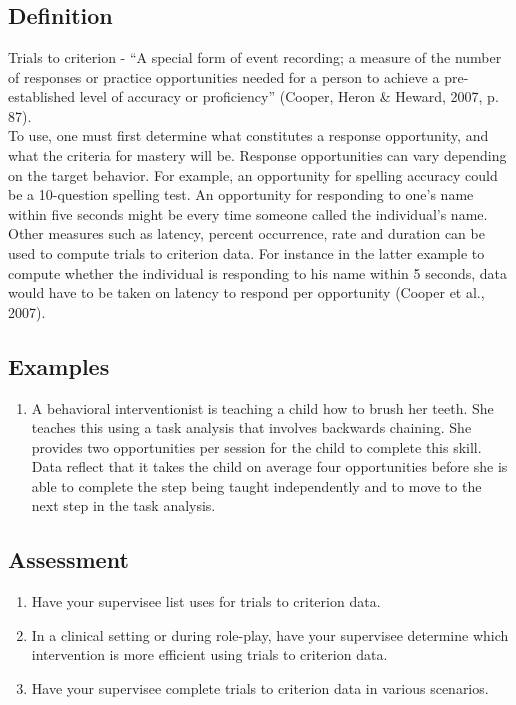 \section{\fouraSeven{}}
\subsection{Definition}
Trials to criterion - ``A special form of event recording; a measure of the number of responses or practice opportunities needed for a person to achieve a pre-established level of accuracy or proficiency'' (Cooper, Heron \& Heward, 2007, p.  87).\\

To use, one must first determine what constitutes a response opportunity, and what the criteria for mastery will be. Response opportunities can vary depending on the target behavior. For example, an opportunity for spelling accuracy could be a 10-question spelling test. An opportunity for responding to one's name within five seconds might be every time someone called the individual's name. Other measures such as latency, percent occurrence, rate and duration can be used to compute trials to criterion data. For instance in the latter example to compute whether the individual is responding to his name within 5 seconds, data would have to be taken on latency to respond per opportunity (Cooper et al., 2007).\\
%
\subsection{Examples}
\begin{enumerate}
\item A behavioral interventionist is teaching a child how to brush her teeth. She teaches this using a task analysis that involves backwards chaining. She provides two opportunities per session for the child to complete this skill. Data reflect that it takes the child on average four opportunities before she is able to complete the step being taught independently and to move to the next step in the task analysis.
\end{enumerate}
%
\subsection{Assessment}
\begin{enumerate}
\item Have your supervisee list uses for trials to criterion data.
\item In a clinical setting or during role-play, have your supervisee determine which intervention is more efficient using trials to criterion data. 
\item Have your supervisee complete trials to criterion data in various scenarios. 
\end{enumerate}
%
